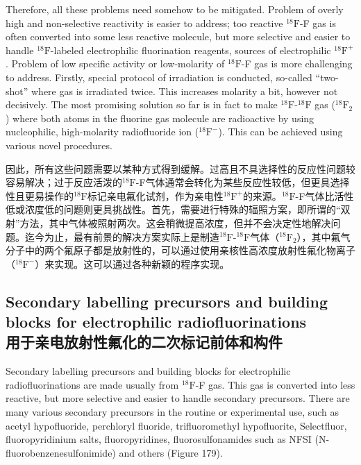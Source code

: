 \documentclass[dvipsnames, svgnames,a4paper,11pt]{article}
\begin{document}
Therefore, all these problems need somehow to be mitigated. Problem of overly high
and non-selective reactivity is easier to address; too reactive ${}^\mathrm{18}\mathrm{F}$-F gas is often
converted into some less reactive molecule, but more selective and easier to handle
${}^\mathrm{18}\mathrm{F}$-labeled electrophilic fluorination reagents, sources of electrophilic {${}^\mathrm{18}\mathrm{F}^+$}.
Problem of low specific activity or low-molarity of ${}^\mathrm{18}\mathrm{F}$-F gas is more challenging to
address. Firstly, special protocol of irradiation is conducted, so-called “two-shot”
where gas is irradiated twice. This increases molarity a bit, however not decisively.
The most promising solution so far is in fact to make ${}^\mathrm{18}\mathrm{F}$-${}^\mathrm{18}\mathrm{F}$ gas (${}^\mathrm{18}\mathrm{F}_2$) where both
atoms in the fluorine gas molecule are radioactive by using nucleophilic, high-molarity radiofluoride ion (${}^\mathrm{18}\mathrm{F}^-$). This can be achieved using various novel procedures. 

因此，所有这些问题需要以某种方式得到缓解。过高且不具选择性的反应性问题较容易解决；过于反应活泼的${}^\mathrm{18}\mathrm{F}$-F气体通常会转化为某些反应性较低，但更具选择性且更易操作的${}^\mathrm{18}\mathrm{F}$标记亲电氟化试剂，作为亲电性{${}^\mathrm{18}\mathrm{F}^+$}的来源。${}^\mathrm{18}\mathrm{F}$-F气体比活性低或浓度低的问题则更具挑战性。首先，需要进行特殊的辐照方案，即所谓的“双射”方法，其中气体被照射两次。这会稍微提高浓度，但并不会决定性地解决问题。迄今为止，最有前景的解决方案实际上是制造${}^\mathrm{18}\mathrm{F}$-${}^\mathrm{18}\mathrm{F}$气体（${}^\mathrm{18}\mathrm{F}_2$），其中氟气分子中的两个氟原子都是放射性的，可以通过使用亲核性高浓度放射性氟化物离子（${}^\mathrm{18}\mathrm{F}^-$）来实现。这可以通过各种新颖的程序实现。

\subsection{Secondary labelling precursors and building blocks for electrophilic radiofluorinations \\用于亲电放射性氟化的二次标记前体和构件}

Secondary labelling precursors and building blocks for electrophilic radiofluorinations
are made usually from ${}^\mathrm{18}\mathrm{F}$-F gas. This gas is converted into less reactive, but more
selective and easier to handle secondary precursors. There are many various
secondary precursors in the routine or experimental use, such as acetyl hypofluoride,
perchloryl fluoride, trifluoromethyl hypofluorite, Selectfluor, fluoropyridinium salts,
fluoropyridines, fluorosulfonamides such as NFSI (N-fluorobenzenesulfonimide) and
others (Figure 179).
\end{document}
